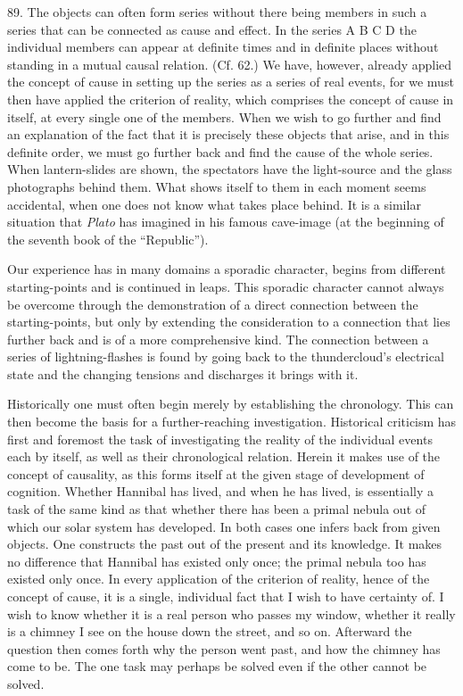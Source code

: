 \documentclass[12pt,a4paper]{book}
\newcommand{\opage}[1]{\marginnote{\footnotesize\textit{[#1]}}}
\begin{document}
89. The objects can often form series without there being members in such a
series that can be connected as cause and effect. In the series A B C D the
individual members can appear at definite times and in definite places
without standing in a mutual causal relation. (Cf. 62.) We have, however,
already applied the concept of cause in setting up the series as a series of
real events, for we must then have applied the criterion of reality, which
comprises the concept of cause in itself, at every single one of the members.
When we wish to go further and find an explanation of the fact that it is
precisely these objects that arise, and in this definite order, we must go
further back and find the cause of the whole series. When lantern-slides are
shown, the spectators have the light-source and the glass photographs behind
them. What shows itself to them in each moment seems accidental, when one does
not know what takes place behind. It is a similar situation that \emph{Plato}
has imagined in his famous cave-image (at the beginning of the seventh book of
the ``Republic'').

Our experience has in many domains a sporadic character, begins from
different starting-points and is continued in leaps. This sporadic character
cannot always be overcome through the demonstration of a direct connection
between the starting-points, but only by extending the consideration to a
connection that lies further back and is of a more comprehensive kind. The
connection between a series of lightning-flashes is found by going back to the
thundercloud's electrical state and the changing tensions and discharges it
brings with it.

Historically one must often begin merely by establishing the chronology. This
can then become the basis for a further-reaching investigation. Historical
criticism has first and foremost the task of investigating the reality of the
individual events each by itself, as well as their chronological relation.
Herein it makes use of the concept of causality, as this \opage{211}forms itself at the
given stage of development of cognition. Whether Hannibal has lived, and when
he has lived, is essentially a task of the same kind as that whether there has
been a primal nebula out of which our solar system has developed. In both
cases one infers back from given objects. One constructs the past out of the
present and its knowledge. It makes no difference that Hannibal has existed only
once; the primal nebula too has existed only once. In every application of the
criterion of reality, hence of the concept of cause, it is a single,
individual fact that I wish to have certainty of. I wish to know whether it is
a real person who passes my window, whether it really is a chimney I see on
the house down the street, and so on. Afterward the question then comes forth
why the person went past, and how the chimney has come to be. The one task may
perhaps be solved even if the other cannot be solved.
\end{document}
